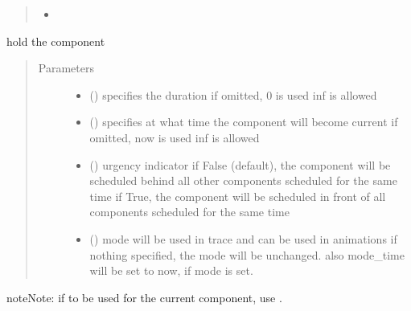 \documentclass[letterpaper,10pt,english]{sphinxmanual}
\begin{document}
\begin{fulllineitems}
\begin{fulllineitems}
\begin{quote}
\begin{description}
\begin{itemize}
\item {} 

\end{itemize}


\end{description}\end{quote}

\end{fulllineitems}


\begin{fulllineitems}
\label{\detokenize{Reference:salabim.Component.hold}}
hold the component
\begin{quote}\begin{description}
\item[{Parameters}] \leavevmode\begin{itemize}
\item {} 
 () \textendash{} specifies the duration 
if omitted, 0 is used 
inf is allowed

\item {} 
 () \textendash{} specifies at what time the component will become current 
if omitted, now is used 
inf is allowed

\item {} 
 () \textendash{} urgency indicator 
if False (default), the component will be scheduled
behind all other components scheduled
for the same time 
if True, the component will be scheduled
in front of all components scheduled
for the same time

\item {} 
 () \textendash{} mode 
will be used in trace and can be used in animations 
if nothing specified, the mode will be unchanged. 
also mode\_time will be set to now, if mode is set.

\end{itemize}

\end{description}\end{quote}

\begin{sphinxadmonition}{note}{Note:}
if to be used for the current component, use . 


\end{sphinxadmonition}
\end{fulllineitems}
\end{fulllineitems}
\end{document}
